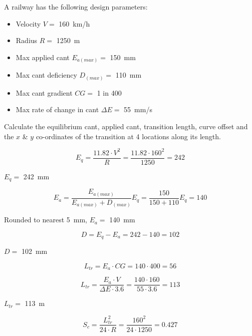 \documentclass{bcrre_exam}
\begin{document}
\begin{questions}
\question 
A railway has the following design parameters:

\begin{itemize}
    \item Velocity $V=$ \qty{160}{km/h}
    \item Radius $R=$ \qty{1250}{m}
    \item Max applied cant $E_{a(max)}=$ \qty{150}{mm}
    \item Max cant deficiency $D_{(max)}=$ \qty{110}{mm}
    \item Max cant gradient $CG=$ \num{1} in \num{400}
    \item Max rate of change in cant $\Delta E=$ \qty{55}{mm/s}
\end{itemize}

Calculate the equilibrium cant, applied cant, transition length, curve offset and the $x$ \& $y$ co-ordinates of the transition at 4 locations along its length.

\begin{solution}
\begin{equation}
    E_q=\frac{11.82 \cdot V^2}{R}=\frac{11.82 \cdot 160^2}{1250} = 242
\end{equation}

$E_q=$ \qty{242}{mm}

\begin{equation}
    E_a=\frac{E_{a(max)}}{E_{a(max)}+D_{(max)}}E_q = \frac{150}{150+110}E_q = 140
\end{equation}

Rounded to nearest \qty{5}{mm}, $E_a=$ \qty{140}{mm}

\begin{equation}
    D=E_q-E_a=242-140=102
\end{equation}

$D=$ \qty{102}{mm}

\begin{equation}
    L_{tr}=E_a \cdot CG = 140 \cdot 400 = 56
\end{equation}

\begin{equation}
    L_{tr} = \frac{E_a \cdot V}{\Delta E \cdot 3.6} = \frac{140 \cdot 160}{55 \cdot 3.6} = 113
\end{equation}

$L_{tr}=$ \qty{113}{m}

\begin{equation}
    S_c=\frac{L_{tr}^2}{24 \cdot R} = \frac{160^2}{24 \cdot 1250} = 0.427
\end{equation}


\end{solution}
\end{questions}
\end{document}
